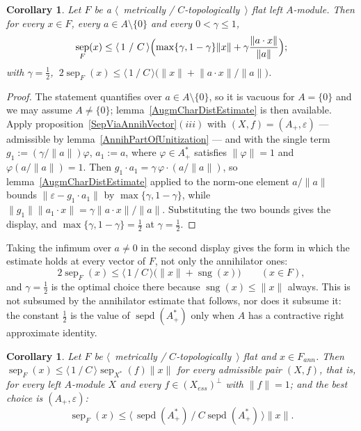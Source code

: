 \documentclass[11pt]{article}
\theoremstyle{plain}
\newtheorem{corollary}[theorem]{Corollary}
\theoremstyle{definition}
\DeclareMathOperator{\sep}{sep}
\DeclareMathOperator{\sepd}{sepd}
\DeclareMathOperator{\sng}{sng}
\begin{document}
\begin{corollary}\label{SepInFlatMod}
Let $F$ be a $\langle$~metrically / $C$-topologically~$\rangle$ flat left
$A$-module. Then for every $x\in F$, every $a\in A\setminus \{0 \}$ and every
$0<\gamma\leq 1$,
\[
\sep_F(x)\leq\langle\,1\ /\ C\,\rangle \Bigl(
  \max \{\gamma,1-\gamma \}\lVert x\rVert
  +\gamma\frac{\lVert a\cdot x\rVert}{\lVert a\rVert}
 \Bigr);
\]
with $\gamma=\tfrac{1}{2}$,
$\ 2\sep_F(x)\leq\langle\,1\ /\ C\,\rangle
\bigl(\lVert x\rVert+\lVert a\cdot x\rVert/\lVert a\rVert \bigr)$.
\end{corollary}

\begin{proof}
The statement quantifies over $a\in A\setminus \{0 \}$, so it is vacuous for
$A= \{0 \}$ and we may assume $A\neq \{0 \}$;
lemma~\ref{AugmCharDistEstimate} is then available. Apply
proposition~\ref{SepViaAnnihVector}$(iii)$ with $(X,f)=(A_+,\varepsilon)$ ---
admissible by lemma~\ref{AnnihPartOfUnitization} --- and with the single term
$g_1:=(\gamma/\lVert a\rVert)\varphi$, $a_1:=a$, where $\varphi\in A_+^*$
satisfies $\lVert\varphi\rVert=1$ and $\varphi(a/\lVert a\rVert)=1$. Then
$g_1\cdot a_1=\gamma\,\varphi\cdot(a/\lVert a\rVert)$, so
lemma~\ref{AugmCharDistEstimate} applied to the norm-one element
$a/\lVert a\rVert$ bounds
$\lVert\varepsilon-g_1\cdot a_1\rVert$ by $\max \{\gamma,1-\gamma \}$, while
$\lVert g_1\rVert\lVert a_1\cdot x\rVert
=\gamma\lVert a\cdot x\rVert/\lVert a\rVert$. Substituting the two bounds gives
the display, and $\max \{\gamma,1-\gamma \}=\tfrac{1}{2}$ at
$\gamma=\tfrac{1}{2}$.
\end{proof}

Taking the infimum over $a\neq 0$ in the second display gives the form in which
the estimate holds at every vector of $F$, not only the annihilator ones:
\[
2\sep_F(x)\leq\langle\,1\ /\ C\,\rangle \bigl(\lVert x\rVert+\sng(x) \bigr)
\qquad(x\in F),
\]
and $\gamma=\tfrac{1}{2}$ is the optimal choice there because
$\sng(x)\leq\lVert x\rVert$ always. This is not subsumed by the annihilator
estimate that follows, nor does it subsume it: the constant $\tfrac{1}{2}$ is the
value of $\sepd(A_+^*)$ only when $A$ has a contractive right approximate
identity.

\begin{corollary}\label{SepOfAnnihVectorInFlatMod}
Let $F$ be $\langle$~metrically / $C$-topologically~$\rangle$ flat and
$x\in F_{ann}$. Then
$\sep_F(x)\leq\langle\,1\ /\ C\,\rangle\sep_{X^*}(f)\lVert x\rVert$ for every
admissible pair $(X,f)$, that is, for every left $A$-module $X$ and every
$f\in{(X_{ess})}^\perp$ with $\lVert f\rVert=1$; and the best choice is
$(A_+,\varepsilon)$:
\[
\sep_F(x)\leq\langle\,\sepd(A_+^*)\ /\ C\sepd(A_+^*)\,\rangle\lVert x\rVert .
\]
\end{corollary}
\end{document}
